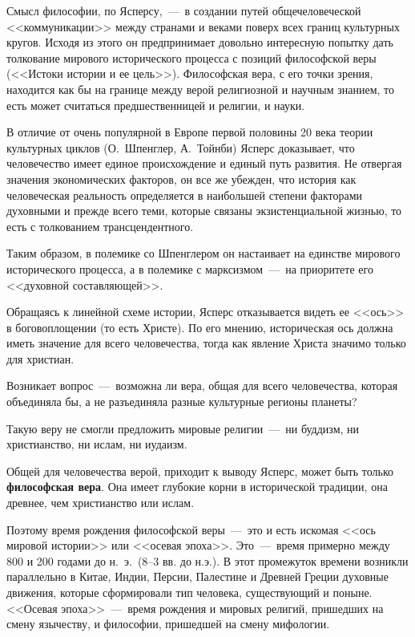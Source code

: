 \documentclass{bmstu}
\begin{document}
Смысл философии, по Ясперсу,~---~в создании путей общечеловеческой <<коммуникации>> между странами и веками поверх всех границ культурных кругов. Исходя из этого он предпринимает довольно интересную попытку дать толкование мирового исторического процесса с позиций философской веры (<<Истоки истории и ее цель>>). Философская вера, с его точки зрения, находится как бы на границе между верой религиозной и научным знанием, то есть может считаться предшественницей и религии, и науки.

В отличие от очень популярной в Европе первой половины 20 века теории культурных циклов (О.~Шпенглер, А.~Тойнби) Ясперс доказывает, что человечество имеет единое происхождение и единый путь развития. Не отвергая значения экономических факторов, он все же убежден, что история как человеческая реальность определяется в наибольшей степени факторами духовными и прежде всего теми, которые связаны экзистенциальной жизнью, то есть с толкованием трансцендентного.

Таким образом, в полемике со Шпенглером он настаивает на единстве мирового исторического процесса, а в полемике с марксизмом~---~на приоритете его <<духовной составляющей>>.

Обращаясь к линейной схеме истории, Ясперс отказывается видеть ее <<ось>> в боговоплощении (то есть Христе). По его мнению, историческая ось должна иметь значение для всего человечества, тогда как явление Христа значимо только для христиан.

Возникает вопрос~---~возможна ли вера, общая для всего человечества, которая объединяла бы, а не разъединяла разные культурные регионы планеты?

Такую веру не смогли предложить мировые религии~---~ни буддизм, ни христианство, ни ислам, ни иудаизм.

Общей для человечества верой, приходит к выводу Ясперс, может быть только \textbf{философская вера}. Она имеет глубокие корни в исторической традиции, она древнее, чем христианство или ислам.

Поэтому время рождения философской веры~---~это и есть искомая <<ось мировой истории>> или <<осевая эпоха>>. Это~---~время примерно между 800 и 200 годами до н.~э.~(8--3 вв. до н.э.). В этот промежуток времени возникли параллельно в Китае, Индии, Персии, Палестине и Древней Греции духовные движения, которые сформировали тип человека, существующий и поныне. <<Осевая эпоха>>~---~время рождения и мировых религий, пришедших на смену язычеству, и философии, пришедшей на смену мифологии.
\end{document}
